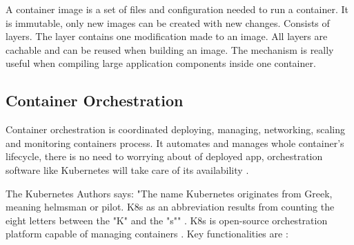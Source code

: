 A container image is a set of files and configuration needed to run a container. It is immutable, only new images can be created with new changes. Consists of layers. The layer contains one modification made to an image. All layers are cachable and can be reused when building an image. The mechanism is really useful when compiling large application components inside one container\cite{DockerImage}. 


\subsection{Container Orchestration}
\label{sec:ContainerOrchestration}

Container orchestration is coordinated deploying, managing, networking, scaling and monitoring containers process. It automates and manages whole container's lifecycle, there is no need to worrying about of deployed app, orchestration software like Kubernetes will take care of its availability \cite{RedhatContainerization}.

The Kubernetes Authors says: "The name Kubernetes originates from Greek, meaning helmsman or pilot. K8s as an abbreviation results from counting the eight letters between the "K" and the "s"" \cite{KubernetesDocs}. K8s is open-source orchestration platform capable of managing containers \cite{KubernetesDocs}. Key functionalities are \cite{KubernetesDocs}:

